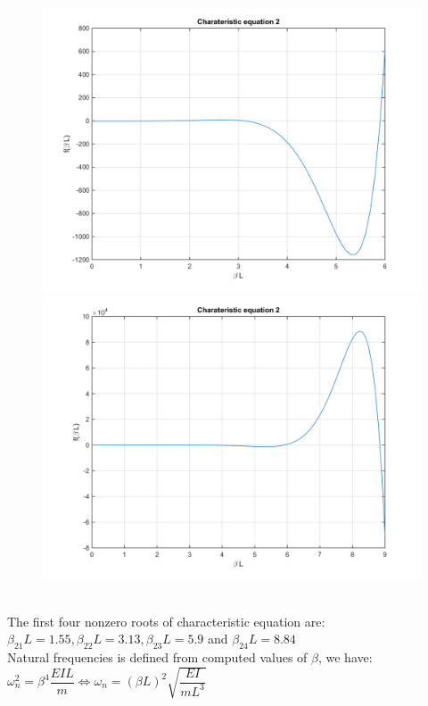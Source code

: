 \documentclass[14pt,a4paper]{article}
\begin{document}
\begin{enumerate}
	\begin{figure}[htp]
		\centering
		\includegraphics[scale=0.4]{hw2_VB3.png}
		\includegraphics[scale=0.4]{hw2_VB4.png}
	\end{figure}\\
	The first four nonzero roots of characteristic equation are: $\beta_{21}L = 1.55, \beta_{22}L = 3.13, \beta_{23}L = 5.9 $ and $\beta_{24}L = 8.84$\\
	Natural frequencies is defined from computed values of $\beta$, we have: \\
	\hspace*{3cm} $\omega_n^2 = \beta^4\dfrac{EIL}{m} \Leftrightarrow \omega_n = (\beta L)^2\sqrt{\dfrac{EI}{mL^3}}$\\

\end{enumerate}
\end{document}
